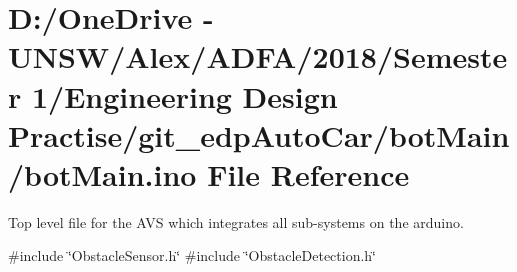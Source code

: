 \hypertarget{bot_main_8ino}{}\section{D\+:/\+One\+Drive -\/ U\+N\+S\+W/\+Alex/\+A\+D\+F\+A/2018/\+Semester 1/\+Engineering Design Practise/git\+\_\+edp\+Auto\+Car/bot\+Main/bot\+Main.ino File Reference}
\label{bot_main_8ino}


Top level file for the A\+VS which integrates all sub-\/systems on the arduino.  


{\ttfamily \#include \char`\"{}Obstacle\+Sensor.\+h\char`\"{}}\newline
{\ttfamily \#include \char`\"{}Obstacle\+Detection.\+h\char`\"{}}\newline
